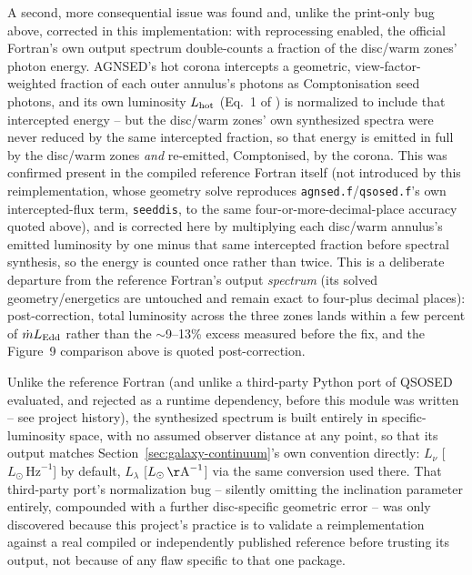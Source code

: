 \documentclass{aastex7}
\begin{document}
A second, more consequential issue was found and, unlike the print-only
bug above, corrected in this implementation: with reprocessing enabled,
the official Fortran's own output spectrum double-counts a fraction of the
disc/warm zones' photon energy. AGNSED's hot corona intercepts a
geometric, view-factor-weighted fraction of each outer annulus's photons
as Comptonisation seed photons, and its own luminosity $L_{\rm hot}$
(Eq.~1 of \citealt{KubotaDone2018}) is normalized to include that
intercepted energy -- but the disc/warm zones' own synthesized spectra
were never reduced by the same intercepted fraction, so that energy is
emitted in full by the disc/warm zones \emph{and} re-emitted, Comptonised,
by the corona. This was confirmed present in the compiled reference
Fortran itself (not introduced by this reimplementation, whose geometry
solve reproduces \texttt{agnsed.f}/\texttt{qsosed.f}'s own intercepted-flux
term, \texttt{seeddis}, to the same four-or-more-decimal-place accuracy
quoted above), and is corrected here by multiplying each disc/warm
annulus's emitted luminosity by one minus that same intercepted fraction
before spectral synthesis, so the energy is counted once rather than
twice. This is a deliberate departure from the reference Fortran's output
\emph{spectrum} (its solved geometry/energetics are untouched and remain
exact to four-plus decimal places): post-correction, total luminosity
across the three zones lands within a few percent of $\dot m L_{\rm Edd}$
rather than the $\sim$9--13\% excess measured before the fix, and the
Figure~9 comparison above is quoted post-correction.

Unlike the reference Fortran (and unlike a third-party Python port of
QSOSED evaluated, and rejected as a runtime dependency, before this module
was written -- see project history), the synthesized spectrum is built
entirely in specific-luminosity space, with no assumed observer distance
at any point, so that its output matches
Section~\ref{sec:galaxy-continuum}'s own convention directly: $L_\nu$
[$L_\odot\,\mathrm{Hz}^{-1}$] by default, $L_\lambda$
[$L_\odot\,\mathrm{\AA}^{-1}$] via the same conversion used there. That
third-party port's normalization bug -- silently omitting the inclination
parameter entirely, compounded with a further disc-specific geometric
error -- was only discovered because this project's practice is to
validate a reimplementation against a real compiled or independently
published reference before trusting its output, not because of any flaw
specific to that one package.
\end{document}
